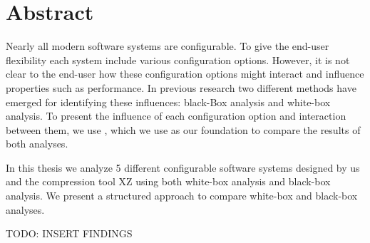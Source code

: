 \begingroup
\let\clearpage\relax
\let\cleardoublepage\relax
\let\cleardoublepage\relax

\chapter*{Abstract}
Nearly all modern software systems are configurable. To give the end-user flexibility each system include various configuration options.
However, it is not clear to the end-user how these configuration options might interact and influence properties such as performance. 
In previous research two different methods have emerged for identifying these influences: black-Box analysis and white-box analysis.
To present the influence of each configuration option and interaction between them, we use {\perfInfluenceModel}, which we use as our foundation
to compare the results of both analyses.

In this thesis we analyze 5 different configurable software systems designed by us and the compression tool \textsc{XZ} using both white-box analysis
and black-box analysis. We present a structured approach to compare white-box and black-box analyses.

TODO: INSERT FINDINGS

\vfill

\endgroup

\vfill
